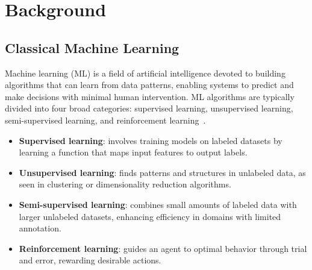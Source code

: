 \chapter{Background}
\label{ch:background}

\section{Classical Machine Learning}

Machine learning (ML) is a field of artificial intelligence devoted to building algorithms that can learn from data patterns, enabling systems to predict and make decisions with minimal human intervention.
ML algorithms are typically divided into four broad categories: supervised learning, unsupervised learning, semi-supervised learning, and reinforcement learning~\cite{shalev-shwartz2014understanding}.

\begin{itemize}
    \item \textbf{Supervised learning}: involves training models on labeled datasets by learning a function that maps input features to output labels.
    \item \textbf{Unsupervised learning}: finds patterns and structures in unlabeled data, as seen in clustering or dimensionality reduction algorithms.
    \item \textbf{Semi-supervised learning}: combines small amounts of labeled data with larger unlabeled datasets, enhancing efficiency in domains with limited annotation.
    \item \textbf{Reinforcement learning}: guides an agent to optimal behavior through trial and error, rewarding desirable actions.
\end{itemize}

